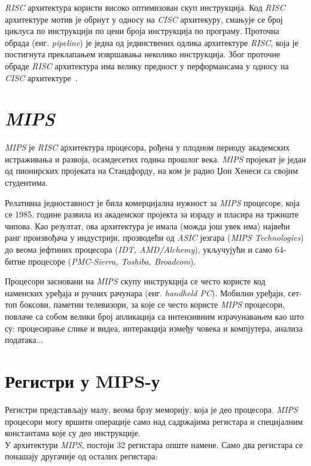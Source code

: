 \documentclass[12pt,oneside]{memoir}
\begin{document}
\indent \textit{RISC} архитектура користи високо оптимизован скуп инструкција. Код \textit{RISC} архитектуре мотив је обрнут у односу на \textit{CISC} архитекуру, смањује се број циклуса по инструкцији по цени броја инструкција по програму. Проточна обрада (енг. \textit{pipeline}) је једна од јединствених одлика архитектуре \textit{RISC}, која је постигнута преклапањем извршавања неколико инструкција. Због проточне обраде \textit{RISC} архитектура има велику предност у перформансама у односу на \textit{CISC} архитектуре~\cite{rcRef}.



\section{\textit{MIPS}}
\label{sec_mips}

\indent \textit{MIPS} је \textit{RISC} архитектура процесора, рођена у плодном периоду академских истраживања и развоја, осамдесетих година прошлог века. \textit{MIPS} пројекат је један од пионирских пројеката на Стандфорду, на ком је радио Џон Хенеси са својим студентима.

\indent Релативна једноставност је била комерцијална нужност за \textit{MIPS} процесоре, која се 1985. године развила из академског пројекта за израду и пласира на тржиште чипова. Као резултат, ова архитектура је имала (можда још увек има) највећи ранг произвођача у индустрији, прозводећи од \textit{ASIC} језгара (\textit{MIPS Technologies}) до веома јефтиних процесора (\textit{IDT, AMD/Alchemy}), укључујући и само 64-битне процесоре (\textit{PMC-Sierra, Toshiba, Broadcom}).

\indent Процесори засновани на \textit{MIPS} скупу инструкција се често користе код наменских уређаја и ручних рачунара (енг. \textit{handheld PC}). Мобилни уређаји, сет-топ боксови, паметни телевизори, за које се често користе \textit{MIPS} процесори, повлаче са собом велики број апликација са интензивним израчунавањем као што су: процесирање слике и видеа, интеракција између човека и компјутера, анализа података...

\section{Регистри у MIPS-у}
\label{registri}

\indent Регистри представљају малу, веома брзу меморију, која је део процесора. \textit{MIPS} процесори могу вршити операције само над садржајима регистара и специјалним константама које су део инструкције. \\
\indent У архитектури \textit{MIPS}, постоји 32 регистара опште намене. Само два регистара се понашају другачије од осталих регистара:
\end{document}
